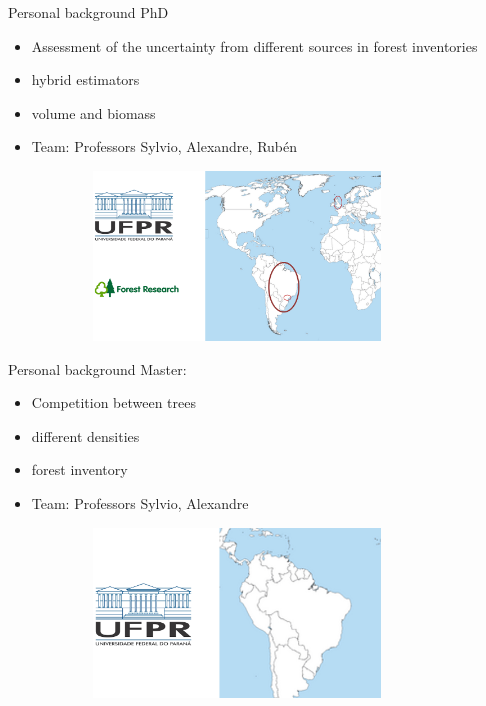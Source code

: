 \documentclass{beamer}
\begin{document}
\begin{frame}{Personal background}
PhD
\begin{itemize}
    \item Assessment of the uncertainty from different sources in forest inventories
    \item hybrid estimators
    \item volume and biomass
    \item Team: Professors Sylvio, Alexandre, Rubén
\end{itemize}

\begin{figure}
        \centering
        \includegraphics[width = 10cm, height = 4.5cm]{pic/vrasil-uk.jpg}
       \end{figure}
\end{frame}

\begin{frame}{Personal background}
Master:
\begin{itemize}
    \item Competition between trees
    \item different densities
    \item forest inventory
    \item Team: Professors Sylvio, Alexandre
\end{itemize}


\begin{figure}
        \centering
        \includegraphics[width = 10cm, height = 4.5cm]{pic/curitiba.jpg}
       \end{figure}
\end{frame}
\end{document}
